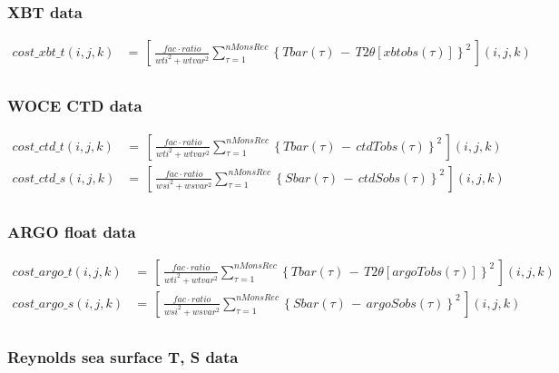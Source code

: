 \subsubsection{XBT data}

\begin{equation}
\begin{split}
cost\_xbt\_t(i,j,k) & = \,
\left[ \, \frac{fac \cdot ratio}{wti^2 + wtvar^2} \sum_{\tau=1}^{nMonsRec}
\left\{ Tbar(\tau) \, - \, T2\theta[xbtobs(\tau)] \right\}^2 \, \right](i,j,k)
 \\
\end{split}
\end{equation}

\subsubsection{WOCE CTD data}

\begin{equation}
\begin{split}
cost\_ctd\_t(i,j,k) & = \,
\left[ \, \frac{fac \cdot ratio}{wti^2 + wtvar^2} \sum_{\tau=1}^{nMonsRec}
\left\{ Tbar(\tau) \, - \, ctdTobs(\tau) \right\}^2 \, \right](i,j,k)
 \\
cost\_ctd\_s(i,j,k) & = \,
\left[ \, \frac{fac \cdot ratio}{wsi^2 + wsvar^2} \sum_{\tau=1}^{nMonsRec}
\left\{ Sbar(\tau) \, - \, ctdSobs(\tau) \right\}^2 \, \right](i,j,k)
 \\
\end{split}
\end{equation}

\subsubsection{ARGO float data}

\begin{equation}
\begin{split}
cost\_argo\_t(i,j,k) & = \,
\left[ \, \frac{fac \cdot ratio}{wti^2 + wtvar^2} \sum_{\tau=1}^{nMonsRec}
\left\{ Tbar(\tau) \, - \, T2\theta[argoTobs(\tau)] \right\}^2 \, \right](i,j,k)
 \\
cost\_argo\_s(i,j,k) & = \,
\left[ \, \frac{fac \cdot ratio}{wsi^2 + wsvar^2} \sum_{\tau=1}^{nMonsRec}
\left\{ Sbar(\tau) \, - \, argoSobs(\tau) \right\}^2 \, \right](i,j,k)
 \\
\end{split}
\end{equation}

\subsubsection{Reynolds sea surface T, S data}

